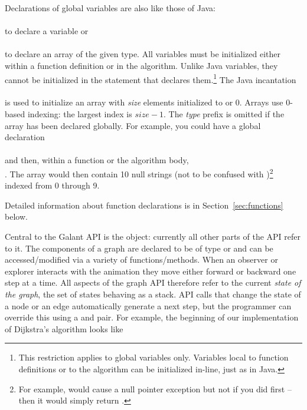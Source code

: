 Declarations of global variables are also like those of Java:\\
\hspace*{1em}\\
to declare a variable or\\
\hspace*{1em}\\
to declare an array of the given type.
All variables must be initialized either within a function definition or
in the algorithm.
Unlike Java variables, they cannot be initialized in the statement that
declares them.\footnote{This restriction applies to global variables
  only. Variables local to function definitions or to the algorithm can be
  initialized in-line, just as in Java.
}
The Java incantation\\
\hspace*{1em}\\
is used to initialize an array with \emph{size} elements initialized to 
or 0. Arrays use 0-based indexing: the largest index is $\mathit{size} -
1$. The \emph{type} prefix is omitted if the array has been declared
globally.
For example, you could have a global declaration\\
\hspace*{1em}\\
and then, within a function or the algorithm body,\\
\hspace*{1em}.
The array  would then contain 10 null strings (not to be confused
with )\footnote{
  For example,  would cause a null pointer
  exception but not if you did  first -- then it would
  simply return .
}
indexed from 0 through 9.
\label{page:arrays}

Detailed
information about function declarations is in Section~\ref{sec:functions}
below.

Central to the Galant API is the  object: currently all other
parts of the API refer to it.
The components of a graph are declared to be of type  or
 and can be accessed/modified via a variety of
functions/methods.
When an observer or explorer interacts with the animation they move either
forward or backward one step at a time.
All aspects of the graph API therefore refer to the current \emph{state of
  the graph}, the set of states behaving as a stack.
API calls that change the state of a node or an edge automatically
generate a next step,
but the programmer can override this using a  and
 pair. For example, the beginning of our implementation of
Dijkstra's algorithm looks like


